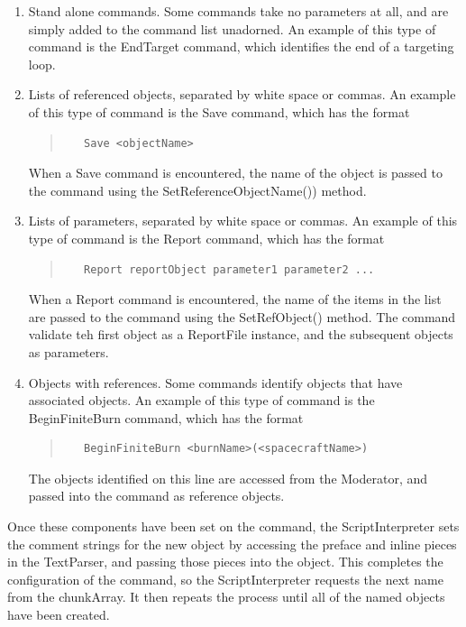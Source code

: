 \begin{enumerate}
\item Stand alone commands.  Some commands take no parameters at all, and are simply added to the
command list unadorned.  An example of this type of command is the EndTarget command, which
identifies the end of a targeting loop.
\item Lists of referenced objects, separated by white space or commas.  An example of this type of
command is the Save command, which has the format
\begin{quote}
\begin{verbatim}
   Save <objectName>
\end{verbatim}
\end{quote}
\noindent When a Save command is encountered, the name of the object is passed to the command using
the SetReferenceObjectName()) method.
\item Lists of parameters, separated by white space or commas.  An example of this type of
command is the Report command, which has the format
\begin{quote}
\begin{verbatim}
   Report reportObject parameter1 parameter2 ...
\end{verbatim}
\end{quote}
\noindent When a Report command is encountered, the name of the items in the list are passed
to the command using the SetRefObject() method.  The command validate teh first object as a
ReportFile instance, and the subsequent objects as parameters.
\item Objects with references.  Some commands identify objects that have associated objects.  An
example of this type of command is the BeginFiniteBurn command, which has the format
\begin{quote}
\begin{verbatim}
   BeginFiniteBurn <burnName>(<spacecraftName>)
\end{verbatim}
\end{quote}
\noindent The objects identified on this line are accessed from the Moderator, and passed into the
command as reference objects.
\end{enumerate}

Once these components have been set on the command, the ScriptInterpreter sets the comment strings
for the new object by accessing the preface and inline pieces in the TextParser, and passing those
pieces into the object.  This completes the configuration of the command, so the ScriptInterpreter
requests the next name from the chunkArray.  It then repeats the process until all of the named
objects have been created.

